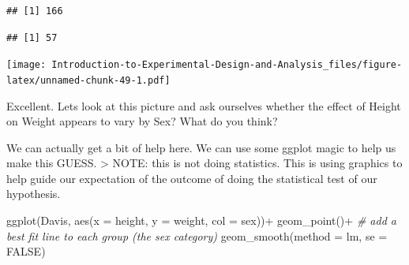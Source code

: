 \documentclass[
]{book}
\newenvironment{Shaded}{\begin{snugshade}}{\end{snugshade}}
\newcommand{\AttributeTok}[1]{\textcolor[rgb]{0.77,0.63,0.00}{#1}}
\newcommand{\CommentTok}[1]{\textcolor[rgb]{0.56,0.35,0.01}{\textit{#1}}}
\newcommand{\ConstantTok}[1]{\textcolor[rgb]{0.00,0.00,0.00}{#1}}
\newcommand{\DecValTok}[1]{\textcolor[rgb]{0.00,0.00,0.81}{#1}}
\newcommand{\FunctionTok}[1]{\textcolor[rgb]{0.00,0.00,0.00}{#1}}
\newcommand{\NormalTok}[1]{#1}
\newcommand{\OtherTok}[1]{\textcolor[rgb]{0.56,0.35,0.01}{#1}}
\newcommand{\SpecialCharTok}[1]{\textcolor[rgb]{0.00,0.00,0.00}{#1}}
\begin{document}
\begin{Shaded}
\end{Shaded}

\begin{verbatim}
## [1] 166
\end{verbatim}

\begin{Shaded}
\end{Shaded}

\begin{verbatim}
## [1] 57
\end{verbatim}

\begin{Shaded}
\end{Shaded}

\texttt{[image: Introduction-to-Experimental-Design-and-Analysis\_files/figure-latex/unnamed-chunk-49-1.pdf]}

Excellent. Lets look at this picture and ask ourselves whether the effect of Height on Weight appears to vary by Sex? What do you think?

We can actually get a bit of help here. We can use some ggplot magic to help us make this GUESS.
\textgreater{} NOTE: this is not doing statistics. This is using graphics to help guide our expectation of the outcome of doing the statistical test of our hypothesis.

\begin{Shaded}
\begin{Highlighting}[]
\FunctionTok{ggplot}\NormalTok{(Davis, }\FunctionTok{aes}\NormalTok{(}\AttributeTok{x =}\NormalTok{ height, }\AttributeTok{y =}\NormalTok{ weight, }\AttributeTok{col =}\NormalTok{ sex))}\SpecialCharTok{+}
  \FunctionTok{geom\_point}\NormalTok{()}\SpecialCharTok{+}
  \CommentTok{\# add a best fit line to each group (the sex category)}
  \FunctionTok{geom\_smooth}\NormalTok{(}\AttributeTok{method =}\NormalTok{ lm, }\AttributeTok{se =} \ConstantTok{FALSE}\NormalTok{)}
\end{Highlighting}
\end{Shaded}
\end{document}
